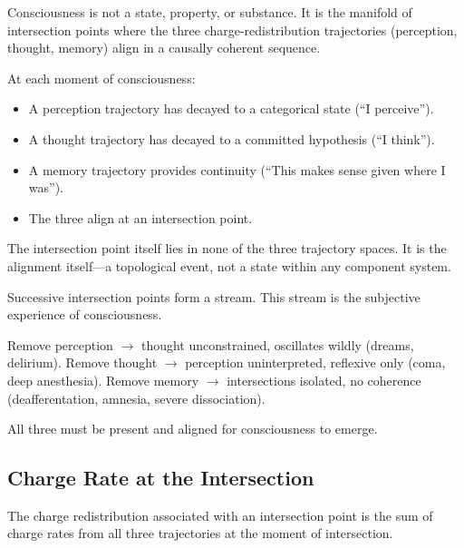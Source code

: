 \begin{principle}
\label{prin:consciousness-intersection}
Consciousness is not a state, property, or substance. It is the manifold of intersection points where the three charge-redistribution trajectories (perception, thought, memory) align in a causally coherent sequence.

At each moment of consciousness:
\begin{itemize}
\item A perception trajectory has decayed to a categorical state (``I perceive'').
\item A thought trajectory has decayed to a committed hypothesis (``I think'').
\item A memory trajectory provides continuity (``This makes sense given where I was'').
\item The three align at an intersection point.
\end{itemize}

The intersection point itself lies in none of the three trajectory spaces. It is the alignment itself—a topological event, not a state within any component system.

Successive intersection points form a stream. This stream is the subjective experience of consciousness.
\end{principle}

\begin{remark}
Remove perception $\to$ thought unconstrained, oscillates wildly (dreams, delirium).
Remove thought $\to$ perception uninterpreted, reflexive only (coma, deep anesthesia).
Remove memory $\to$ intersections isolated, no coherence (deafferentation, amnesia, severe dissociation).

All three must be present and aligned for consciousness to emerge.
\end{remark}

\subsection{Charge Rate at the Intersection}

The charge redistribution associated with an intersection point is the sum of charge rates from all three trajectories at the moment of intersection.

